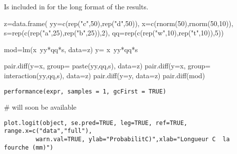 \documentclass[a4paper]{book}
\begin{document}
%
\begin{SeeAlso}\relax
Is included in  for the long format of the results.
\end{SeeAlso}
%
\begin{Examples}
\begin{ExampleCode}

z=data.frame( yy=c(rep("c",50),rep("d",50)),
              x=c(rnorm(50),rnorm(50,10)),
              s=rep(c(rep("a",25),rep("b",25)),2),
              qq=rep(c(rep("w",10),rep("t",10)),5))

mod=lm(x~yy*qq*s, data=z)
y= x~yy*qq*s

pair.diff(y=x, group= paste(yy,qq,s), data=z)
pair.diff(y=x, group= interaction(yy,qq,s), data=z)
pair.diff(y=y, data=z)
pair.diff(mod)
\end{ExampleCode}
\end{Examples}
\newpage
{}
%
\begin{Usage}
\begin{verbatim}
performance(expr, samples = 1, gcFirst = TRUE)
\end{verbatim}
\end{Usage}
%
\begin{Arguments}
\begin{ldescription}
\item[\code{expr}] 


\item[\code{samples}] 


\item[\code{gcFirst}] 


\end{ldescription}
\end{Arguments}
%
\begin{Examples}
\begin{ExampleCode}
# will soon be available
\end{ExampleCode}
\end{Examples}
\newpage
{}
%
\begin{Usage}
\begin{verbatim}
plot.logit(object, se.pred=TRUE, leg=TRUE, ref=TRUE, range.x=c("data","full"), 
         warn.val=TRUE, ylab="ProbabilitC)",xlab="Longueur C  la fourche (mm)")
\end{verbatim}
\end{Usage}
%
\end{document}
